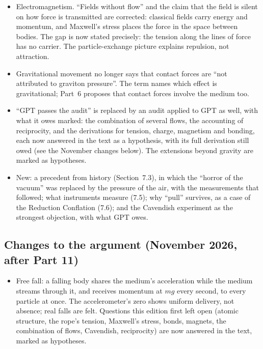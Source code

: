 \documentclass[11pt,a4paper]{article}
\begin{document}
\begin{itemize}
  \item Electromagnetism. ``Fields without flow'' and the claim that the field is silent on how force is transmitted are corrected: classical fields carry energy and momentum, and Maxwell's stress places the force in the space between bodies. The gap is now stated precisely: the tension along the lines of force has no carrier. The particle-exchange picture explains repulsion, not attraction.
  \item Gravitational movement no longer says that contact forces are ``not attributed to graviton pressure''. The term names which effect is gravitational; Part~6 proposes that contact forces involve the medium too.
  \item ``GPT passes the audit'' is replaced by an audit applied to GPT as well, with what it owes marked: the combination of several flows, the accounting of reciprocity, and the derivations for tension, charge, magnetism and bonding, each now answered in the text as a hypothesis, with its full derivation still owed (see the November changes below). The extensions beyond gravity are marked as hypotheses.
  \item New: a precedent from history (Section~7.3), in which the ``horror of the vacuum'' was replaced by the pressure of the air, with the measurements that followed; what instruments measure (7.5); why ``pull'' survives, as a case of the Reduction Conflation (7.6); and the Cavendish experiment as the strongest objection, with what GPT owes.
\end{itemize}

\subsection*{Changes to the argument (November 2026, after Part 11)}
\begin{itemize}
  \item Free fall: a falling body shares the medium's acceleration while the medium streams through it, and receives momentum at $mg$ every second, to every particle at once. The accelerometer's zero shows uniform delivery, not absence; real falls are felt. Questions this edition first left open (atomic structure, the rope's tension, Maxwell's stress, bonds, magnets, the combination of flows, Cavendish, reciprocity) are now answered in the text, marked as hypotheses.
\end{itemize}
\end{document}
